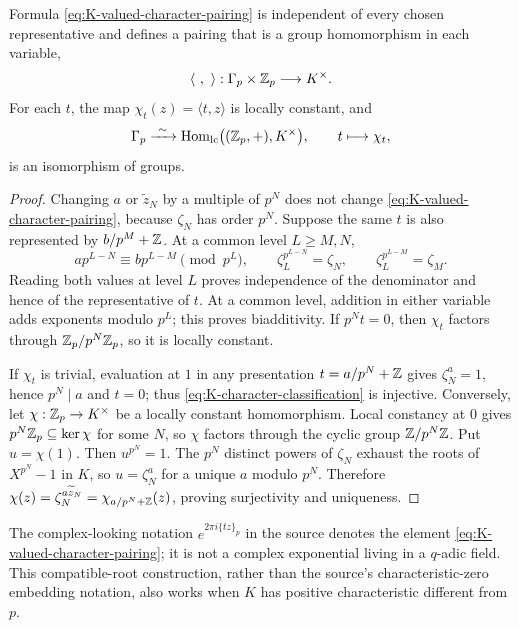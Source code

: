 \begin{proposition}
\label{prop:K-valued-character-duality}
Formula \cref{eq:K-valued-character-pairing} is independent of every chosen
representative and defines a pairing that is a group homomorphism in each
variable,
\[
 \langle\ ,\ \rangle:\Gamma_p\times\Z_p\longrightarrow K^\times.
\]
For each $t$, the map $\chi_t(z)=\langle t,z\rangle$ is locally constant,
and
\begin{equation}
\label{eq:K-character-classification}
 \Gamma_p\xrightarrow{\ \sim\ }
 \operatorname{Hom}_{\mathrm{lc}}\bigl((\mathbb Z_p,+),K^\times\bigr),
 \qquad t\longmapsto\chi_t,
\end{equation}
is an isomorphism of groups.
\end{proposition}

\begin{proof}
Changing $a$ or $\widetilde z_N$ by a multiple of $p^N$ does not change
\cref{eq:K-valued-character-pairing}, because $\zeta_N$ has order $p^N$.
Suppose the same $t$ is also represented by $b/p^M+\mathbb Z$.  At a common level
$L\geq M,N$,
\[
 ap^{L-N}\equiv bp^{L-M}\pmod{p^L},
 \qquad \zeta_L^{p^{L-N}}=\zeta_N,
 \qquad \zeta_L^{p^{L-M}}=\zeta_M.
\]
Reading both values at level $L$ proves independence of the denominator and
hence of the representative of $t$.  At a common level, addition in either
variable adds exponents modulo $p^L$; this proves biadditivity.  If
$p^Nt=0$, then $\chi_t$ factors through $\mathbb Z_p/p^N\mathbb Z_p$, so it is locally
constant.

If $\chi_t$ is trivial, evaluation at $1$ in any presentation
$t=a/p^N+\mathbb Z$ gives $\zeta_N^a=1$, hence $p^N\mid a$ and $t=0$; thus
\cref{eq:K-character-classification} is injective.  Conversely, let
$\chi:\mathbb Z_p\to K^\times$ be a locally constant homomorphism.  Local
constancy at $0$ gives $p^N\mathbb Z_p\subseteq\ker\chi$ for some $N$, so $\chi$
factors through the cyclic group $\mathbb Z/p^N\mathbb Z$.  Put $u=\chi(1)$.  Then
$u^{p^N}=1$.  The $p^N$ distinct powers of $\zeta_N$ exhaust the roots of
$X^{p^N}-1$ in $K$, so $u=\zeta_N^a$ for a unique $a$ modulo $p^N$.
Therefore $\chi(z)=\zeta_N^{a\widetilde z_N}=\chi_{a/p^N+\mathbb Z}(z)$, proving
surjectivity and uniqueness.
\end{proof}

The complex-looking notation $e^{2\pi i\{tz\}_p}$ in the source denotes
the element \cref{eq:K-valued-character-pairing}; it is not a complex
exponential living in a $q$-adic field.  This compatible-root construction,
rather than the source's characteristic-zero embedding notation, also works
when $K$ has positive characteristic different from $p$.

